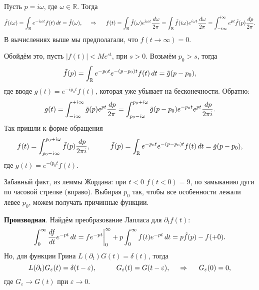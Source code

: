 Пусть $p = i \omega$, где $\omega \in \mathbb{R}$. Тогда
\begin{equation*}
    \tilde{f} (i \omega) = \int_{\mathbb{R}} e^{- i \omega t} f(t) \, d t = \hat{f} (\omega),
    \hspace{0.5cm} \Rightarrow \hspace{0.5cm}
    f(t)  =\int_{\mathbb{R}} \hat{f}(\omega) e^{i \omega t} \frac{\, d \omega}{2\pi} = 
    \int_{\mathbb{R}} \tilde{f} (i \omega) e^{i \omega t} \frac{\, d \omega}{2 \pi} = 
    \int_{- i \infty}^{i \infty} e^{p t} \tilde{f} (p) \frac{\, d p}{2\pi}.
\end{equation*}
В вычислениях выше мы предполагали, что $f(t \to \infty) = 0$. 

Обойдём это, пусть $|f(t)| < M e^{s t}$, при $s > 0$. Возьмём $p_0 > s$, тогда
\begin{equation*}
    \tilde{f} (p) = \int_{\mathbb{R}} e^{- p_0 t} e^{-(p-p_0)t} f(t) \, d t = \tilde{g}(p-p_0),
\end{equation*}
где вводе $g(t) = e^{- i p_0 t} f(t)$, которая уже убывает на бесконечности. Обратно:
\begin{equation*}
    g(t) = \int_{-i\infty}^{+i\infty}  \tilde{g}(p) e^{pt} \frac{\, d p}{2\pi} = 
    \int_{p_0 - i \omega}^{p_0 + i \omega} \tilde{g}(p-p_0) e^{- p_0 t} e^{pt} \frac{\, d p}{2\pi i}.
\end{equation*}
Так пришли к форме обращения
\begin{equation}
    f(t) = \int_{p_0 - i \infty}^{p_0 + i \omega} \tilde{f}(p) \frac{\d p}{2 \pi i},
    \hspace{10 mm} 
    \tilde{f}(p) = \int_{\mathbb{R}} e^{- p_0  t} e^{-(p-p_0)t} f(t) \d t = \tilde{g}(p-p_0),
\end{equation}
где $g(t) = e^{- i p_0 t} f(t)$.



Забавный факт, из леммы Жордана: при $t < 0$ $f(t<0) = 9$, по замыканию дуги по часовой стрелке (вправо). Выбирая $p_0$ так, чтобы все особенности лежали левее $p_0$, можем получать причинные функции. 




\textbf{Производная}. Найдём преобразование Лапласа для $\partial_t f(t)$:
\begin{equation*}
    \int_{0}^{\infty} \frac{d f}{d t} e^{- p t} \, d t = f e^{- pt} \bigg|_0^{\infty} + p \int_{0}^{\infty} 
    f(t) e^{-pt} \, d t = p \tilde{f}(p) - f(+0).
\end{equation*}
Но, для функции Грина $L(\partial_t) G(t) = \delta(t)$, тогда
\begin{equation*}
    L(\partial_t) G_\varepsilon(t) = \delta(t-\varepsilon),
    \hspace{10 mm} 
    G_\varepsilon (t) = G(t-\varepsilon),
    \hspace{0.5cm} \Rightarrow \hspace{0.5cm}
    G_\varepsilon(0)=  0,
\end{equation*}
где $G_\varepsilon \to G(t)$ при $\varepsilon \to 0$.  

